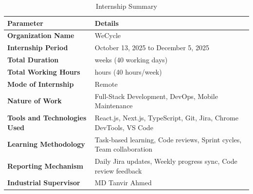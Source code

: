 \begin{table}[H]
\centering
\caption{Internship Summary}
\label{tab:internship-summary}
\renewcommand{\arraystretch}{1.4}
\begin{tabularx}{\textwidth}{|>{\centering\arraybackslash}p{5cm}|>{\arraybackslash}X|}
\hline
\textbf{Parameter} & \textbf{Details} \\
\hline
\textbf{Organization Name} & WeCycle \\
\hline
\textbf{Internship Period} & October 13, 2025 to December 5, 2025 \\
\hline
\textbf{Total Duration} & 8 weeks (40 working days) \\
\hline
\textbf{Total Working Hours} & 320 hours (40 hours/week) \\
\hline
\textbf{Mode of Internship} & Remote \\
\hline
\textbf{Nature of Work} & Full-Stack Development, DevOps, Mobile Maintenance \\
\hline
\textbf{Tools and Technologies Used} & React.js, Next.js, TypeScript, Git, Jira, Chrome DevTools, VS Code \\
\hline
\textbf{Learning Methodology} & Task-based learning, Code reviews, Sprint cycles, Team collaboration \\
\hline
\textbf{Reporting Mechanism} & Daily Jira updates, Weekly progress sync, Code review feedback \\
\hline
\textbf{Industrial Supervisor} & MD Tanvir Ahmed \\
\hline
\end{tabularx}
\end{table}
